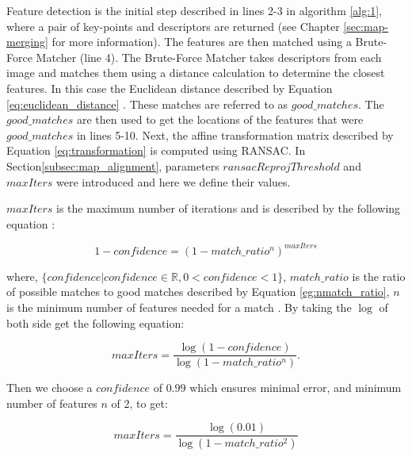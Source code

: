 Feature detection is the initial step described in lines 2-3 in algorithm \ref{alg:1}, where a pair of key-points and descriptors are returned (see Chapter \ref{sec:map-merging} for more information). The features are then matched using a Brute-Force Matcher (line 4). The Brute-Force Matcher takes descriptors from each image and matches them using a distance calculation to determine the closest features. In this case the Euclidean distance described by Equation \ref{eq:euclidean_distance} \cite{Lowe2004}. These matches are referred to as $good\_matches$. The $good\_matches$ are then used to get the locations of the features that were $good\_matches$ in lines 5-10. Next, the affine transformation matrix described by Equation \ref{eq:transformation} is computed using RANSAC. In Section\ref{subsec:map_alignment}, parameters $ransacReprojThreshold$ and $maxIters$ were introduced and here we define their values. 

\textbf{$maxIters$} is the maximum number of iterations and is described by the following equation :

\begin{equation}
    1-confidence = (1 - match\_ratio^{n})^{maxIters}
\end{equation}

where, $\{confidence | confidence \in \mathbb{R}, 0 < confidence < 1 \}$, $match\_ratio$ is the ratio of possible matches to good matches described by Equation \ref{eg:nmatch_ratio}, $n$ is the minimum number of features needed for a match \cite{Fischler1981}. By taking the $\log$ of both side get the following equation:

\begin{equation}
    maxIters = \frac{\log(1-confidence)}{ \log(1 - match\_ratio^{n})}.
\end{equation}

Then we choose a $confidence$ of $0.99$ which ensures minimal error, and minimum number of features $n$ of 2, to get:

\begin{equation}
    maxIters = \frac{\log(0.01)}{ \log(1 - match\_ratio^{2})}
\end{equation}


